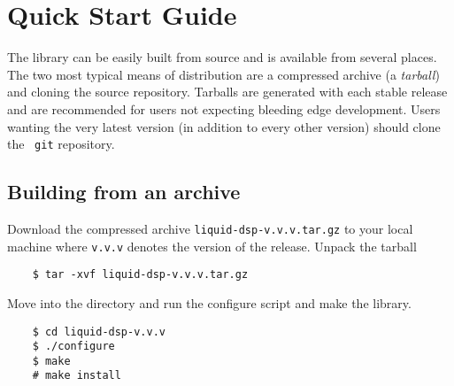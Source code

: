 %
%

\section{Quick Start Guide}
\label{section:quickstart}
The library can be easily built from source and is available from
several places.
The two most typical means of distribution are a compressed archive
(a {\em tarball}) and cloning the source repository.
Tarballs are generated with each stable release and are recommended for
users not expecting bleeding edge development.
Users wanting the very latest version (in addition to every other
version) should clone the \liquid\ {\tt git} repository.

\subsection{Building from an archive}
\label{section:quickstart:build_from_tarball}
\label{xxx}
Download the compressed archive {\tt liquid-dsp-v.v.v.tar.gz} to your
local machine where {\tt v.v.v} denotes the version of the release.
%
%
%
%
Unpack the tarball
%
\begin{verbatim}
    $ tar -xvf liquid-dsp-v.v.v.tar.gz
\end{verbatim}
%
Move into the directory and run the configure script and make the
library.
%
\begin{verbatim}
    $ cd liquid-dsp-v.v.v
    $ ./configure
    $ make
    # make install
\end{verbatim}

